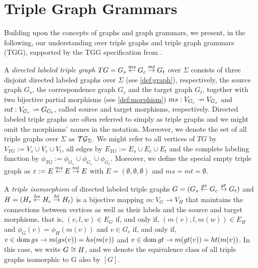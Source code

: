 \section{Triple Graph Grammars}
Building upon the concepts of graphs and graph grammars, we present, in the following, our understanding over triple graphs and triple graph grammars (TGG), supported by the TGG specification from \cite{schurr1994specification}.


\begin{definition}
	A \emph{directed labeled triple graph} $TG = G_s \overset{ms}{\leftarrow} G_c \overset{mt}{\rightarrow} G_t$ over $\Sigma$ consists of three disjoint directed labeled graphs over $\Sigma$ (see \ref{def:graph}), respectively, the source graph $G_s$, the correspondence graph $G_c$ and the target graph $G_t$, together with two bijective partial morphisms (see \ref{def:morphism}) $ms: V_{G_c} \nrightarrow V_{G_s}$ and $mt : V_{G_c} \nrightarrow G_{G_t}$, called source and target morphisms, respectively. Directed labeled triple graphs are often referred to simply as triple graphs and we might omit the morphisms' names in the notation. Moreover, we denote the set of all triple graphs over $\Sigma$ as $\mathcal{TG}_{\Sigma}$. We might refer to all vertices of $TG$ by $V_{TG}:= V_s \cup V_c \cup V_t$, all edges by $E_{TG}:= E_s \cup E_c \cup E_t$ and the complete labeling function by $\phi_{TG}:= \phi_{G_s} \cup \phi_{G_c} \cup \phi_{G_t}$.
	Moreover, we define the special empty triple graph as $\varepsilon := E \overset{ms}{\leftarrow} E \overset{mt}{\rightarrow} E$ with $E = (\emptyset, \emptyset, \emptyset)$ and $ms = mt = \emptyset$.
\end{definition}


\begin{definition}
	A \emph{triple isomorphism} of directed labeled triple graphs $G = (G_s \overset{gs}{\leftarrow} G_c \overset{gt}{\rightarrow} G_t)$ and $H = (H_s \overset{hs}{\leftarrow} H_c \overset{ht}{\rightarrow} H_t)$ is a bijective mapping $m: V_G \to V_H$ that maintains the connections between vertices as well as their labels and the source and target morphisms, that is, $(v,l,w) \in E_G$ if, and only if, $(m(v),l,m(w)) \in E_H$ and $\phi_G(v) = \phi_H(m(v))$ and $v \in G_c$ if, and only if, $v \in \operatorname{dom} gs \rightarrow m(gs(v)) = hs(m(v))$ and $v \in \operatorname{dom} gt \rightarrow m(gt(v)) = ht(m(v))$. In this case, we write $G \cong H$, and we denote the equivalence class of all triple graphs isomorphic to G also by $[G]$.
\end{definition}

